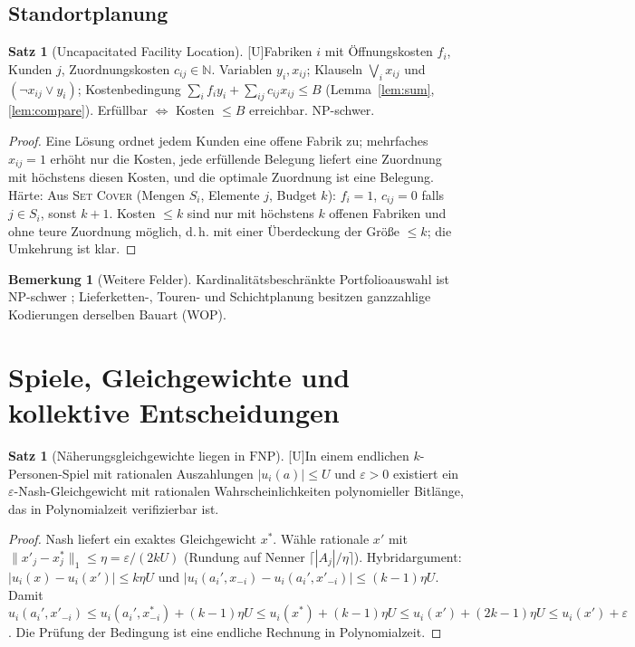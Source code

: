 \documentclass[a4paper,12pt]{article}
\theoremstyle{definition}
\newtheorem{satz}[definition]{Satz}
\newtheorem{bemerkung}[definition]{Bemerkung}
\newcommand{\tU}{\textsf{\small[U]}}   %
\newcommand{\NN}{\mathbb{N}}
\newcommand{\cNP}{\ensuremath{\mathrm{NP}}}
\newcommand{\cFNP}{\ensuremath{\mathrm{FNP}}}
\begin{document}
\subsection{Standortplanung}
\begin{satz}[Uncapacitated Facility Location]\tU\label{satz:ufl}
Fabriken \(i\) mit Öffnungskosten \(f_i\), Kunden \(j\), Zuordnungskosten \(c_{ij}\in\NN\). Variablen \(y_i,x_{ij}\); Klauseln \(\bigvee_ix_{ij}\) und \((\neg x_{ij}\vee y_i)\); Kostenbedingung \(\sum_if_iy_i+\sum_{ij}c_{ij}x_{ij}\le B\) (Lemma~\ref{lem:sum}, \ref{lem:compare}). Erfüllbar \(\iff\) Kosten \(\le B\) erreichbar. \cNP-schwer.
\end{satz}
\begin{proof}
Eine Lösung ordnet jedem Kunden eine offene Fabrik zu; mehrfaches \(x_{ij}=1\) erhöht nur die Kosten, jede erfüllende Belegung liefert eine Zuordnung mit höchstens diesen Kosten, und die optimale Zuordnung ist eine Belegung. Härte: Aus \textsc{Set Cover} (Mengen \(S_i\), Elemente \(j\), Budget \(k\)): \(f_i=1\), \(c_{ij}=0\) falls \(j\in S_i\), sonst \(k+1\). Kosten \(\le k\) sind nur mit höchstens \(k\) offenen Fabriken und ohne teure Zuordnung möglich, d.\,h. mit einer Überdeckung der Größe \(\le k\); die Umkehrung ist klar.
\end{proof}

\begin{bemerkung}[Weitere Felder]
Kardinalitätsbeschränkte Portfolioauswahl ist \cNP-schwer \cite{bienstock1996}; Lieferketten-, Touren- und Schichtplanung besitzen ganzzahlige Kodierungen derselben Bauart (WOP).
\end{bemerkung}

\section{Spiele, Gleichgewichte und kollektive Entscheidungen}
\label{eco:games}

\begin{satz}[Näherungsgleichgewichte liegen in \(\cFNP\)]\tU\label{satz:eps-nash}
In einem endlichen \(k\)-Personen-Spiel mit rationalen Auszahlungen \(|u_i(a)|\le U\) und \(\varepsilon>0\) existiert ein \(\varepsilon\)-Nash-Gleichgewicht mit rationalen Wahrscheinlichkeiten polynomieller Bitlänge, das in Polynomialzeit verifizierbar ist.
\end{satz}
\begin{proof}
Nash \cite{nash1951} liefert ein exaktes Gleichgewicht \(x^\ast\). Wähle rationale \(x'\) mit \(\|x'_j-x^\ast_j\|_1\le\eta=\varepsilon/(2kU)\) (Rundung auf Nenner \(\lceil|A_j|/\eta\rceil\)). Hybridargument: \(|u_i(x)-u_i(x')|\le k\eta U\) und \(|u_i(a_i',x_{-i})-u_i(a_i',x'_{-i})|\le(k-1)\eta U\). Damit \(u_i(a_i',x'_{-i})\le u_i(a_i',x^\ast_{-i})+(k-1)\eta U\le u_i(x^\ast)+(k-1)\eta U\le u_i(x')+(2k-1)\eta U\le u_i(x')+\varepsilon\). Die Prüfung der Bedingung ist eine endliche Rechnung in Polynomialzeit.
\end{proof}
\end{document}
